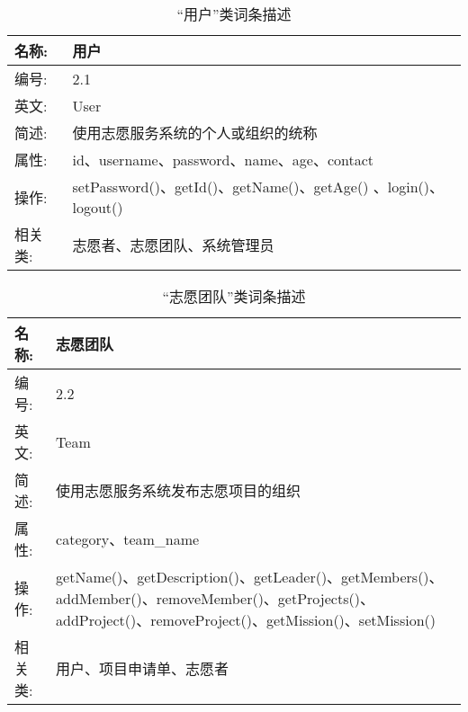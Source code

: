 \begin{table}[H]  
\caption{“用户”类词条描述}  
\begin{center}  
    \begin{tabular}{l p{11cm}} 
        \hline
        \quad 名称:  &  用户 \\
        \hline
        \quad 编号:  & 2.1 \\
        \hline
        \quad 英文:  &  User \\
        \hline
        \quad 简述:  & 使用志愿服务系统的个人或组织的统称 \\
        \hline
        \quad 属性:  & id、username、password、name、age、contact \\
        \hline
        \quad 操作:  & setPassword()、getId()、getName()、getAge() 、login()、logout() \\
        \hline
        \quad 相关类:  & 志愿者、志愿团队、系统管理员 \\
        \hline
    \end{tabular}
\end{center}
\end{table}

\begin{table}[H]  
\caption{“志愿团队”类词条描述}  
\begin{center}  
    \begin{tabular}{l p{11cm}} 
        \hline
        \quad 名称:  &  志愿团队 \\
        \hline
        \quad 编号:  & 2.2 \\
        \hline
        \quad 英文:  &  Team \\
        \hline
        \quad 简述:  & 使用志愿服务系统发布志愿项目的组织 \\
        \hline
        \quad 属性:  & category、team\_name \\
        \hline 
        \quad 操作:  & getName()、getDescription()、getLeader()、getMembers()、addMember()、removeMember()、getProjects()、addProject()、removeProject()、getMission()、setMission()
\\
        \hline
        \quad 相关类:  & 用户、项目申请单、志愿者 \\
        \hline
    \end{tabular}
\end{center}
\end{table}

